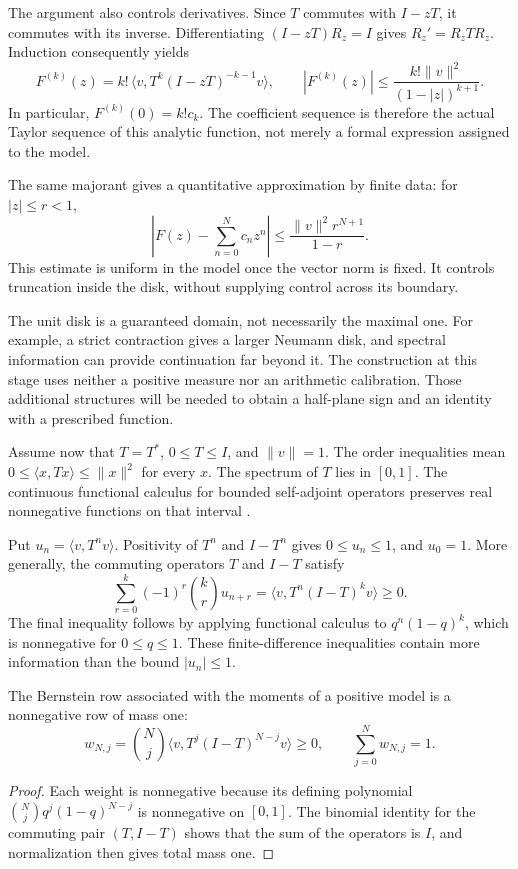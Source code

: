 The argument also controls derivatives. Since $T$ commutes with
$I-zT$, it commutes with its inverse. Differentiating
$(I-zT)R_z=I$ gives $R_z'=R_zTR_z$. Induction consequently yields
\[
 F^{(k)}(z)=k!\,
   \langle v,T^k(I-zT)^{-k-1}v\rangle,
 \qquad
 |F^{(k)}(z)|\le
   \frac{k!\|v\|^2}{(1-|z|)^{k+1}}.
\]
In particular, $F^{(k)}(0)=k!c_k$. The coefficient sequence is
therefore the actual Taylor sequence of this analytic function, not
merely a formal expression assigned to the model.

The same majorant gives a quantitative approximation by finite data:
for $|z|\le r<1$,
\[
 \left|F(z)-\sum_{n=0}^Nc_nz^n\right|
 \le\frac{\|v\|^2r^{N+1}}{1-r}.
\]
This estimate is uniform in the model once the vector norm is fixed.
It controls truncation inside the disk, without supplying control
across its boundary.

The unit disk is a guaranteed domain, not necessarily the maximal
one. For example, a strict contraction gives a larger Neumann disk,
and spectral information can provide continuation far beyond it.
The construction at this stage uses neither a positive measure nor
an arithmetic calibration. Those additional structures will be needed
to obtain a half-plane sign and an identity with a prescribed function.

\label{hilb:positive}
Assume now that $T=T^*$, $0\le T\le I$, and $\|v\|=1$.
The order inequalities mean
$0\le\langle x,Tx\rangle\le\|x\|^2$ for every $x$.
The spectrum of $T$ lies in $[0,1]$. The continuous functional
calculus for bounded self-adjoint operators preserves real
nonnegative functions on that interval \cite{conway}.

Put $u_n=\langle v,T^nv\rangle$. Positivity of $T^n$ and
$I-T^n$ gives $0\le u_n\le1$, and $u_0=1$. More generally,
the commuting operators $T$ and $I-T$ satisfy
\[
 \sum_{r=0}^{k}(-1)^r\binom kr u_{n+r}
 =\langle v,T^n(I-T)^kv\rangle\ge0.
\]
The final inequality follows by applying functional calculus to
$q^n(1-q)^k$, which is nonnegative for $0\le q\le1$.
These finite-difference inequalities contain more information than
the bound $|u_n|\le1$.

\begin{proposition}\label{hilb:bernstein-operator}
The Bernstein row associated with the moments of a positive model is
a nonnegative row of mass one:
\[
 w_{N,j}=\binom Nj\langle v,T^j(I-T)^{N-j}v\rangle\ge0,
 \qquad \sum_{j=0}^Nw_{N,j}=1.
\]
\end{proposition}
\begin{proof}
Each weight is nonnegative because its defining polynomial
$\binom Nj q^j(1-q)^{N-j}$ is nonnegative on $[0,1]$.
The binomial identity for the commuting pair $(T,I-T)$
shows that the sum of the operators is $I$, and normalization
then gives total mass one.
\end{proof}

